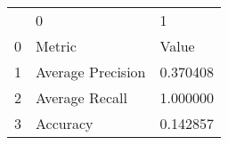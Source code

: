 \begin{tabular}{lll}
 & 0 & 1 \\
0 & Metric & Value \\
1 & Average Precision & 0.370408 \\
2 & Average Recall & 1.000000 \\
3 & Accuracy & 0.142857 \\
\end{tabular}
